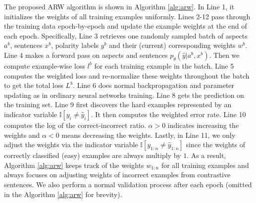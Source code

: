 The proposed ARW algorithm is shown in Algorithm \ref{alg:arw}.
In Line 1, it initializes the weights of all training examples uniformly.
Lines 2-12 pass through the training data epoch-by-epoch and update the example weights at the end of each epoch.
Specifically, Line 3 retrieves one randomly sampled batch of aspects $a^b$, sentences $x^b$, polarity labels $y^b$ and their (current) corresponding weights $w^b$.
Line 4 makes a forward pass on aspects and sentences $p_\theta(\hat{y}|a^b, x^b)$. Then we compute example-wise loss $l^b$ for each training example in the batch.
Line 5 computes the weighted loss and re-normalize these weights throughout the batch to get the total loss $L^b$. 
Line 6 does normal backpropagation and parameter updating as in ordinary neural networks training.
Line 8 gets the prediction on the training set.
Line 9 first discovers the hard examples represented by an indicator variable $\mathbb{I}[y_{i}\neq \hat{y}_{i}] $.
It then computes the weighted error rate. 
Line 10 computes the log of the correct-incorrect ratio. $\alpha >0$ indicates increasing the weights and $\alpha<0$ means decreasing the weights.
Lastly, in Line 11, we only adjust the weights via the indicator variable $\mathbb{I}[y_{1:n} \neq \hat{y}_{1:n}]$ since the weights of correctly classified (easy) examples are always multiply by $1$.
As a result, Algorithm \ref{alg:arw} keeps track of the weights $w_{1:n}$ for all training examples and always focuses on adjusting weights of incorrect examples from contrastive sentences. We also perform a normal validation process after each epoch (omitted in the Algorithm \ref{alg:arw} for brevity).



